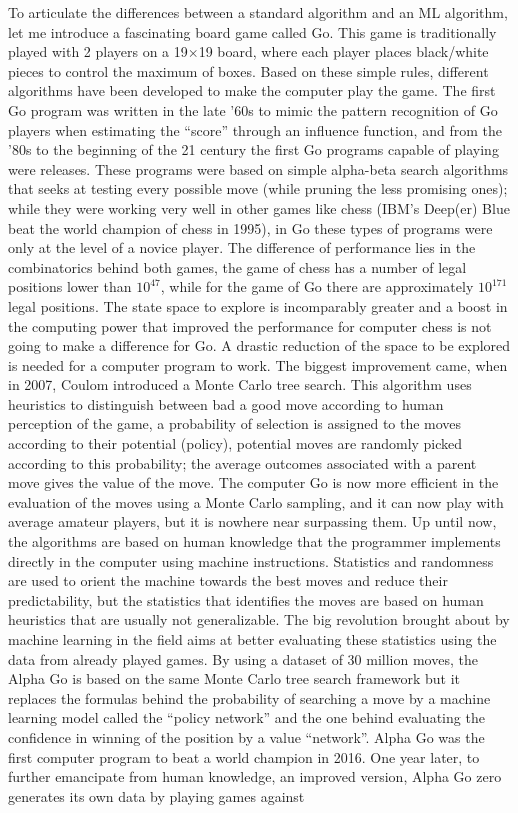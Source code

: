 \documentclass[main]{subfiles}
\begin{document}
To articulate the differences between a standard algorithm and an ML algorithm, let me introduce a fascinating board game called Go. This game is traditionally played with 2 players on a 19$\times$19 board, where each player places black/white pieces to control the maximum of boxes. Based on these simple rules, different algorithms have been developed to make the computer play the game. The first Go program was written in the late ’60s to mimic the pattern recognition of Go players when estimating the ``score'' through an influence function,\autocite{zobrist1970feature} and from the ’80s to the beginning of the 21 century the first Go programs capable of playing were releases. These programs were based on simple alpha-beta search algorithms that seeks at testing every possible move (while pruning the less promising ones); while they were working very well in other games like chess (IBM's Deep(er) Blue beat the world champion of chess in 1995), in Go these types of programs were only at the level of a novice player. The difference of performance lies in the combinatorics behind both games, the game of chess has a number of legal positions lower than $10^{47}$,\autocite{website_labelle} while for the game of Go there are approximately $10^{171}$ legal positions.\autocite{Tromp_2007,github_tromp_go} The state space to explore is incomparably greater and a boost in the computing power that improved the performance for computer chess is not going to make a difference for Go. A drastic reduction of the space to be explored is needed for a computer program to work. The biggest improvement came, when in 2007, Coulom introduced a Monte Carlo tree search.\autocite{Coulom_2007} This algorithm uses heuristics to distinguish between bad a good move according to human perception of the game, a probability of selection is assigned to the moves according to their potential (policy), potential moves are randomly picked according to this probability; the average outcomes associated with a parent move gives the value of the move. The computer Go is now more efficient in the evaluation of the moves using a Monte Carlo sampling, and it can now play with average amateur players, but it is nowhere near surpassing them. Up until now, the algorithms are based on human knowledge that the programmer implements directly in the computer using machine instructions. Statistics and randomness are used to orient the machine towards the best moves and reduce their predictability, but the statistics that identifies the moves are based on human heuristics that are usually not generalizable. The big revolution brought about by machine learning in the field aims at better evaluating these statistics using the data from already played games. By using a dataset of 30 million moves, the Alpha Go is based on the same Monte Carlo tree search framework but it replaces the formulas behind the probability of searching a move by a machine learning model called the ``policy network'' and the one behind evaluating the confidence in winning of the position by a value ``network''.\autocite{Silver_2016} Alpha Go was the first computer program to beat a world champion in 2016. One year later, to further emancipate from human knowledge, an improved version, Alpha Go zero generates its own data by playing games against 
\end{document}

